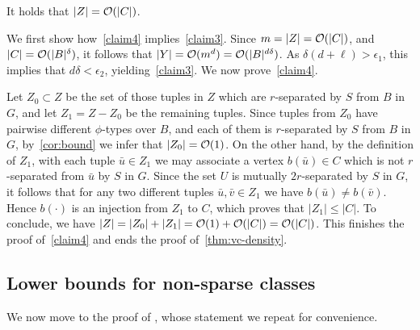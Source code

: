   \begin{claim}\label{claim4}
It holds that $|Z|=\mathcal{O}(|C|)$.
  \end{claim}
  
  We first show how~\cref{claim4} implies~\cref{claim3}.
  Since $m=|Z|=\mathcal{O}(|C|)$,
  and $|C|=\mathcal{O}(|B|^\delta)$,
  it follows that $|Y|=\mathcal{O}(m^d)=\mathcal{O}(|B|^{d\delta})$. As $\delta(d+\ell)>\epsilon_1$, this implies that $d\delta<\epsilon_2$, yielding~\cref{claim3}.
  We now prove~\cref{claim4}.

\medskip
  Let $Z_0\subset Z$ be the set of 
  those tuples in $Z$ which are $r$-separated by $S$ from $B$ in $G$,
  and let $Z_1=Z-Z_0$ be the remaining  tuples.
  Since tuples from $Z_0$ have pairwise different $\phi$-types over $B$, and each of them is $r$-separated by $S$ from $B$ in $G$, by~\cref{cor:bound} we infer that $|Z_0|=\mathcal{O}(1)$.  
 On the other hand, by the definition of $Z_1$, with each tuple $\bar u\in Z_1$ we may associate a vertex $b(\bar u)\in C$ which is not $r$-separated from $\bar u$ by $S$ in $G$.
 Since the set $U$ is mutually $2r$-separated by $S$ in $G$, it follows that for any two different tuples $\bar u,\bar v\in Z_1$ we have $b(\bar u)\neq b(\bar v)$.
 Hence $b(\cdot)$ is an injection from $Z_1$ to $C$, which proves that $|Z_1|\leq |C|$.
 To conclude, we have $|Z|=|Z_0|+|Z_1|=\mathcal{O}(1)+\mathcal{O}(|C|)=\mathcal{O}(|C|)$. This finishes the proof of~\cref{claim4} and ends the proof of~\cref{thm:vc-density}.
  
\subsection{Lower bounds for non-sparse classes}
We now move to the proof of ,
whose statement we repeat for convenience.



